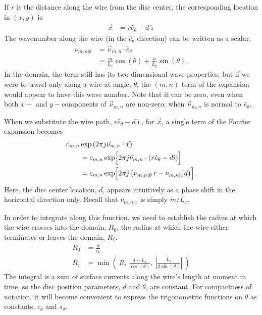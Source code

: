\documentclass{article}
\def\x{\vec{x}}
\def\eth{\hat{e}_\theta}
\def\vnu{\vec{\nu}_{m,n}}
\def\nuth{\nu_{m,n|\theta}}
\def\ui{\hat{\imath}}
\begin{document}
If $r$ is the distance along the wire from the disc center, the corresponding location in $(x,y)$ is
\begin{align}
\x &= r \eth - d \ui
\end{align}
The wavenumber along the wire (in the $\eth$ direction) can be written as a scalar,
\begin{align}
\nuth &= \vnu \cdot \hat{e}_\theta\nonumber\\
 &= \frac{m}{L_x} \cos(\theta) + \frac{n}{L_y} \sin(\theta).
\end{align}
In the domain, the term still has its two-dimensional wave properties, but if we were to travel only along a wire at angle, $\theta$, the $(m,n)$ term of the expansion would appear to have this wave number.  Note that it can be zero, even when both $x-$ and $y-$components of $\vnu$ are non-zero; when $\vnu$ is normal to $\eth$.

When we substitute the wire path, $r \hat{e}_\theta - d\ui$, for $\x$, a single term of the Fourier expansion becomes
\begin{align*}
&c_{m,n} \exp\left(2\pi j \vnu \cdot \x \right)\\
&\hspace{2em}= c_{m,n} \exp\Bigl[2\pi j \vnu \cdot (r\hat{e}_\theta - d \ui) \Bigr]\\
&\hspace{2em}= c_{m,n} \exp\Bigl[2\pi j \left(\nuth\,r - \nu_{m,n|x} d\right)\Bigr].
\end{align*}
Here, the disc center location, $d$, appears intuitively as a phase shift in the horizontal direction only.  Recall that $\nu_{m,n|x}$ is simply $m / L_x$.

In order to integrate along this function, we need to establish the radius at which the wire crosses into the domain, $R_0$, the radius at which the wire either terminates or leaves the domain, $R_1$:
\begin{align}
R_0 &= \frac{d}{c_\theta}\\
R_1 &= \min\left(\ R,\ \frac{d + L_x}{\cos(\theta)},\ \left|\frac{L_y}{2\sin(\theta)}\right|\ \right)
\end{align}
The integral is a sum of surface currents along the wire's length at moment in time, so the disc position parameters, $d$ and $\theta$, are constant.  For compactness of notation, it will become convenient to express the trigonometric functions on $\theta$ as constants, $c_\theta$ and $s_\theta$.
\end{document}
